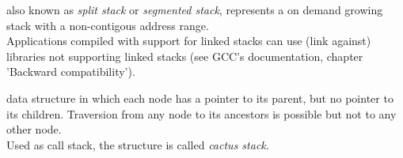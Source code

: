 also known as \emph{split stack}\cite{gccsplit} or
\emph{segmented stack}\cite{llvmseg}, represents a on demand growing stack
with a non-contigous address range.\\
Applications compiled with support for linked stacks can use (link against)
libraries not supporting linked stacks (see GCC's documentation\cite{gccsplit},
chapter 'Backward compatibility').

data structure in which each node has a pointer to its parent, but no pointer to
its children. Traversion from any node to its ancestors is possible but not to
any other node.\\
Used as call stack, the structure is called \emph{cactus stack}.
